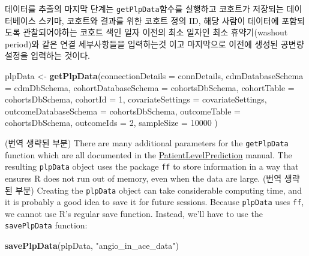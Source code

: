 \documentclass[11pt]{book}
\newenvironment{Shaded}{\begin{snugshade}}{\end{snugshade}}
\newcommand{\KeywordTok}[1]{\textcolor[rgb]{0.13,0.29,0.53}{\textbf{#1}}}
\newcommand{\DataTypeTok}[1]{\textcolor[rgb]{0.13,0.29,0.53}{#1}}
\newcommand{\DecValTok}[1]{\textcolor[rgb]{0.00,0.00,0.81}{#1}}
\newcommand{\StringTok}[1]{\textcolor[rgb]{0.31,0.60,0.02}{#1}}
\newcommand{\NormalTok}[1]{#1}
\theoremstyle{definition}
\theoremstyle{definition}
\theoremstyle{definition}
\theoremstyle{remark}
\begin{document}
데이터를 추출의 마지막 단계는 \texttt{getPlpData}함수를 실행하고
코호트가 저장되는 데이터베이스 스키마, 코호트와 결과를 위한 코호트 정의
ID, 해당 사람이 데이터에 포함되도록 관찰되어야하는 코호트 색인 일자
이전의 최소 일자인 최소 휴약기(washout period)와 같은 연결 세부사항들을
입력하는것 이고 마지막으로 이전에 생성된 공변량 설정을 입력하는 것이다.

\begin{Shaded}
\begin{Highlighting}[]
\NormalTok{plpData <-}\StringTok{ }\KeywordTok{getPlpData}\NormalTok{(}\DataTypeTok{connectionDetails =}\NormalTok{ connDetails,}
                      \DataTypeTok{cdmDatabaseSchema =}\NormalTok{ cdmDbSchema,}
                      \DataTypeTok{cohortDatabaseSchema =}\NormalTok{ cohortsDbSchema,}
                      \DataTypeTok{cohortTable =}\NormalTok{ cohortsDbSchema,}
                      \DataTypeTok{cohortId =} \DecValTok{1}\NormalTok{,}
                      \DataTypeTok{covariateSettings =}\NormalTok{ covariateSettings,}
                      \DataTypeTok{outcomeDatabaseSchema =}\NormalTok{ cohortsDbSchema,}
                      \DataTypeTok{outcomeTable =}\NormalTok{ cohortsDbSchema,}
                      \DataTypeTok{outcomeIds =} \DecValTok{2}\NormalTok{,}
                      \DataTypeTok{sampleSize =} \DecValTok{10000}
\NormalTok{)}
\end{Highlighting}
\end{Shaded}

(번역 생략된 부분) There are many additional parameters for the
\texttt{getPlpData} function which are all documented in the
\href{https://ohdsi.github.io/PatientLevelPrediction/}{PatientLevelPrediction}
manual. The resulting \texttt{plpData} object uses the package
\texttt{ff} to store information in a way that ensures R does not run
out of memory, even when the data are large. (번역 생략된 부분) Creating
the \texttt{plpData} object can take considerable computing time, and it
is probably a good idea to save it for future sessions. Because
\texttt{plpData} uses \texttt{ff}, we cannot use R's regular save
function. Instead, we'll have to use the \texttt{savePlpData} function:

\begin{Shaded}
\begin{Highlighting}[]
\KeywordTok{savePlpData}\NormalTok{(plpData, }\StringTok{"angio_in_ace_data"}\NormalTok{)}
\end{Highlighting}
\end{Shaded}
\end{document}
